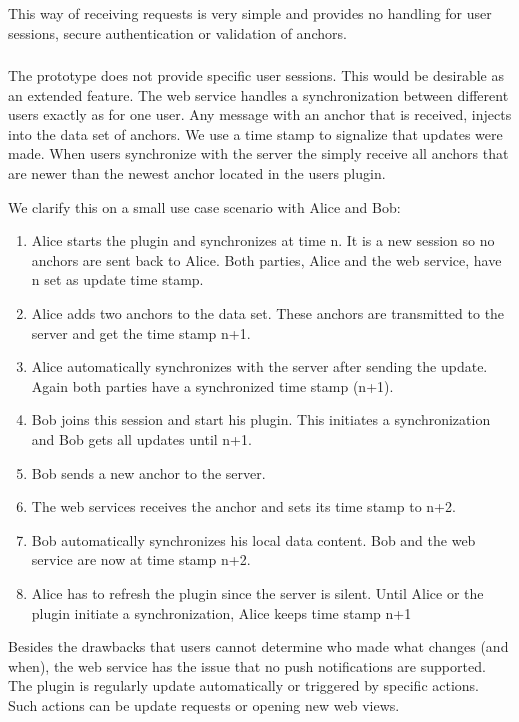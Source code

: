This way of receiving requests is very simple and provides no handling for user sessions, secure authentication or validation of anchors.

\subsubsection[User Session Synchronization]{\reqWSii}

The prototype does
 not
 provide specific user sessions. This would be desirable as an extended feature. The web service handles a synchronization between different users exactly as for one user. 
Any message with an anchor that is received, injects into the data set of anchors. We use a time stamp to signalize that updates were made. When users synchronize with the server the simply receive all anchors that are newer than the newest anchor located in the users plugin. 

We clarify this on a small use case scenario with Alice and Bob:
\begin{enumerate}
\item Alice starts the plugin and synchronizes at time n. It is a new session so no anchors are sent back to Alice. Both parties, Alice and the web service, have n set as update time stamp.
\item Alice adds two anchors to the data set. These anchors are transmitted to the server and get the time stamp n+1.
\item Alice automatically synchronizes with the server after sending the update. Again both parties have a synchronized time stamp (n+1).
\item Bob joins this session and start his plugin. This initiates a synchronization and Bob gets all updates until n+1.
\item Bob sends a new anchor to the server. 
\item The web services receives the anchor and sets its time stamp to n+2. 
\item Bob automatically synchronizes his local data content. Bob and the web service are now at time stamp n+2. 
\item Alice has to refresh the plugin since the server is silent. Until Alice or the plugin initiate a synchronization, Alice  keeps time stamp n+1
\end{enumerate}

Besides the drawbacks that users cannot determine who made what changes (and when), the web service has the issue that no push notifications are supported. The plugin is regularly update automatically or triggered by specific actions. Such actions can be update requests or opening new web views. 

